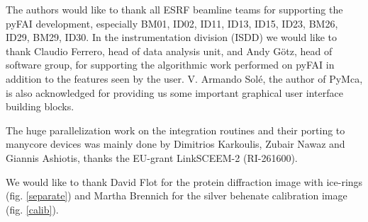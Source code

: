 \documentclass[preprint]{iucr}
\begin{document}

The authors would like to thank all ESRF beamline teams for supporting the
pyFAI development, especially BM01, ID02, ID11, ID13, ID15, ID23, BM26, ID29, BM29,
ID30. In the instrumentation division (ISDD) we would like to thank Claudio
Ferrero, head of data analysis unit, and Andy G\"otz, head of software group, for
supporting the algorithmic work performed on pyFAI in addition to the features
seen by the user.
V. Armando Solé, the author of PyMca, is also acknowledged for providing us some
important graphical user interface building blocks.

The huge parallelization work on the integration routines and their porting to
manycore devices was mainly done by Dimitrios Karkoulis, Zubair Nawaz and Giannis Ashiotis,
thanks the EU-grant LinkSCEEM-2 (RI-261600).

We would like to thank David Flot for the protein
diffraction image with ice-rings (fig. \ref{separate}) and Martha Brennich for
the silver behenate calibration image (fig. \ref{calib}).
\end{document}
